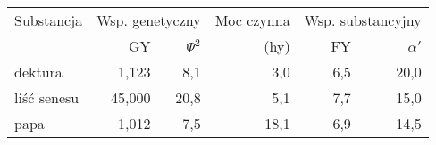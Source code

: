 \documentclass[a4paper]{article}
\begin{document}
\begin{tabular}{|l|r|r|r|r|r|}\hline
Substancja & \multicolumn{2}{c|}{Wsp. genetyczny} & Moc czynna 
\hfill& \multicolumn{2}{c|}{Wsp. substancyjny}\\ 
 \cline{2-3} \cline{5-6}%
        &  GY & $\Psi^2$ &  (hy) & FY & $\alpha'$ \\ \hline
dektura      &  1,123 &  8,1 & 3,0 & 6,5  & 20,0 \\
liść senesu  & 45,000 & 20,8 & 5,1 & 7,7  & 15,0 \\
papa         &  1,012 &  7,5 & 18,1 & 6,9 & 14,5 \\  \hline
\end{tabular}
\end{document}
